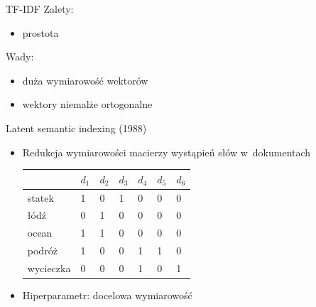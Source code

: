 \documentclass{beamer}
\begin{document}
	\begin{frame}{TF-IDF}
		Zalety:
		\begin{itemize}
			\item prostota
		\end{itemize}
		Wady:
		\begin{itemize}
			\item duża wymiarowość wektorów
			\item wektory niemalże ortogonalne
		\end{itemize}
	\end{frame}
		
	\begin{frame}{Latent semantic indexing (1988)}
		\begin{itemize}
			\item Redukcja wymiarowości macierzy wystąpień słów w~dokumentach
			\begin{center}
				\begin{tabular}{ | l | l | l | l | l | l | l |}
					\hline
					 & $d_1$ & $d_2$ & $d_3$ & $d_4$  & $d_5$  & $d_6$ \\ \hline
					statek & 1 & 0 & 1 & 0 & 0 & 0 \\ \hline
					łódź & 0 & 1 & 0 & 0 & 0 & 0 \\ \hline
					ocean & 1 & 1 & 0 & 0 & 0 & 0 \\ \hline
					podróż & 1 & 0 & 0 & 1 & 1 & 0 \\ \hline
					wycieczka & 0 & 0 & 0 & 1 & 0 & 1 \\
					\hline
				\end{tabular}
			\end{center}
			\item Hiperparametr: docelowa wymiarowość
		\end{itemize}
	\end{frame}
\end{document}
